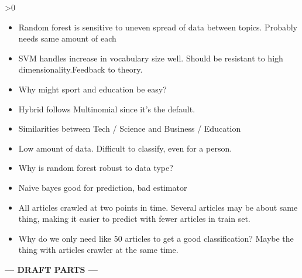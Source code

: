 \ifnum\printdraft>0
	\begin{itemize}
		\item Random forest is sensitive to uneven spread of data between topics. Probably needs same amount of each
		\item SVM handles increase in vocabulary size well. Should be resistant to high dimensionality.Feedback to theory.
		\item Why might sport and education be easy?
		\item Hybrid follows Multinomial since it's the default.
		\item Similarities between Tech / Science and Business / Education
		\item Low amount of data. Difficult to classify, even for a person.
		\item Why is random forest robust to data type?
		\item Naive bayes good for prediction, bad estimator
		\item All articles crawled at two points in time. Several articles may be about same thing, making it easier to predict with fewer articles in train set.
		\item Why do we only need like 50 articles to get a good classification? Maybe the thing with articles crawler at the same time.
	\end{itemize}
\else
\begin{center}
	\textbf{--- DRAFT PARTS ---}
\end{center}
\fi

